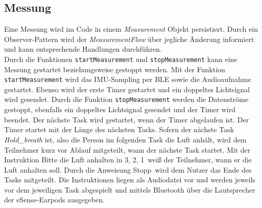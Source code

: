 \subsection{Messung}
\label{ch:Implementierung:app:measurement}
Eine Messung wird im Code in einem \textit{Measurement} Objekt persistiert.
Durch ein Observer-Pattern wird der \textit{MeasurementFlow} über jegliche Änderung informiert und kann entsprechende Handlungen durchführen. \\
Durch die Funktionen \texttt{startMeasurement} und \texttt{stopMeasurement} kann eine Messung gestartet beziehungsweise gestoppt werden.
Mit der Funktion \texttt{startMeasurement} wird das IMU-Sampling per BLE sowie die Audioaufnahme gestartet. 
Ebenso wird der erste Timer gestartet und ein doppeltes Lichtsignal wird gesendet. 
Durch die Funktion \texttt{stopMeasurement} werden die Datenströme gestoppt, ebenfalls ein doppeltes Lichtsignal gesendet und der Timer wird beendet.
Der nächste Task wird gestartet, wenn der Timer abgelaufen ist. Der Timer startet mit der Länge des nächsten Tasks.
Sofern der nächste Task {\glqq \textit{Hold\_breath}\grqq} ist, also die Person im folgenden Task die Luft anhält, wird dem Teilnehmer kurz vor Ablauf mitgeteilt, wann der nächste Task startet.
Mit der Instruktion \glqq Bitte die Luft anhalten in 3, 2, 1\grqq \ weiß der Teilnehmer, wann er die Luft anhalten soll.
Durch die Anweisung \glqq Stopp\grqq \ wird dem Nutzer das Ende des Tasks mitgeteilt. 
Die Instruktionen liegen als Audiodatei vor und werden jeweils vor dem jeweiligen Task abgespielt und mittels Bluetooth über die Lautsprecher der eSense-Earpods ausgegeben.

\newpage
